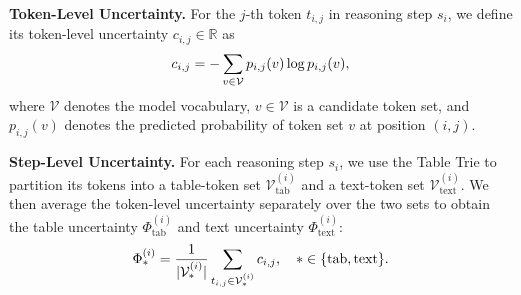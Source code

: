 \documentclass[11pt]{article}
\begin{document}

\textbf{Token-Level Uncertainty.}
For the $j$-th token $t_{i,j}$ in reasoning step $s_i$, we define its token-level uncertainty $c_{i,j} \in \mathbb{R}$ as
\begin{equation}
c_{i,j} = - \sum_{v \in \mathcal{V}} p_{i,j}(v)\log p_{i,j}(v),
\vspace{-6pt}
\end{equation}
where $\mathcal{V}$ denotes the model vocabulary, $v \in \mathcal{V}$ is a candidate token set, and $p_{i,j}(v)$ denotes the predicted probability of token set $v$ at position $(i,j)$.

\textbf{Step-Level Uncertainty.}
For each reasoning step $s_i$, we use the Table Trie to partition its tokens into a table-token set $\mathcal{V}_{\text{tab}}^{(i)}$ and a text-token set $\mathcal{V}_{\text{text}}^{(i)}$. We then average the token-level uncertainty separately over the two sets to obtain the table uncertainty $\Phi_{\text{tab}}^{(i)}$ and text uncertainty $\Phi_{\text{text}}^{(i)}$:
\vspace{-4pt}
\begin{equation}
\Phi_{\ast}^{(i)}=
\frac{1}{|\mathcal{V}_{\ast}^{(i)}|}
\sum_{t_{i,j}\in\mathcal{V}_{\ast}^{(i)}} c_{i,j},
\quad \ast \in \{\text{tab}, \text{text}\}.
\vspace{-8pt}
\end{equation}


\vspace{-4pt}
\end{document}
